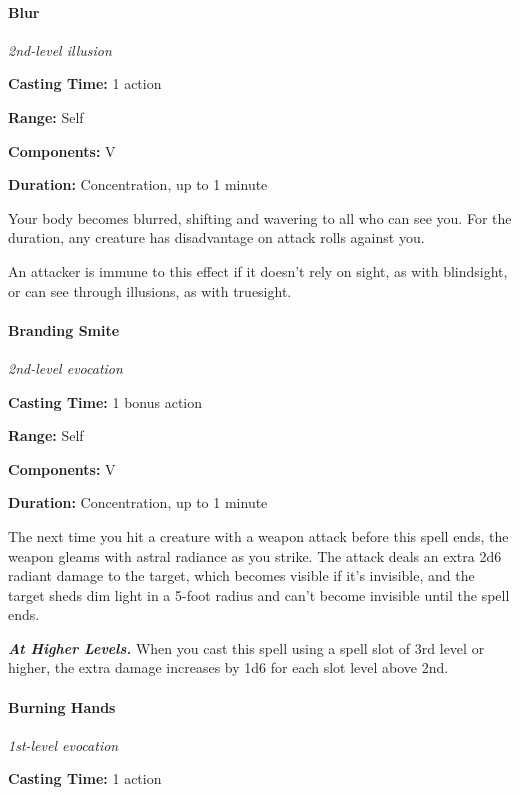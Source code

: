 \documentclass[
]{article}
\begin{document}
\hypertarget{blur}{%
\paragraph{Blur}\label{blur}}

\emph{2nd-level illusion}

\textbf{Casting Time:} 1 action

\textbf{Range:} Self

\textbf{Components:} V

\textbf{Duration:} Concentration, up to 1 minute

Your body becomes blurred, shifting and wavering to all who can see you.
For the duration, any creature has disadvantage on attack rolls against
you.

An attacker is immune to this effect if it doesn't rely on sight, as
with blindsight, or can see through illusions, as with truesight.

\hypertarget{branding-smite}{%
\paragraph{Branding Smite}\label{branding-smite}}

\emph{2nd-level evocation}

\textbf{Casting Time:} 1 bonus action

\textbf{Range:} Self

\textbf{Components:} V

\textbf{Duration:} Concentration, up to 1 minute

The next time you hit a creature with a weapon attack before this spell
ends, the weapon gleams with astral radiance as you strike. The attack
deals an extra 2d6 radiant damage to the target, which becomes visible
if it's invisible, and the target sheds dim light in a 5-foot radius and
can't become invisible until the spell ends.

\emph{\textbf{At Higher Levels.}} When you cast this spell using a spell
slot of 3rd level or higher, the extra damage increases by 1d6 for each
slot level above 2nd.

\hypertarget{burning-hands}{%
\paragraph{Burning Hands}\label{burning-hands}}

\emph{1st-level evocation}

\textbf{Casting Time:} 1 action
\end{document}
